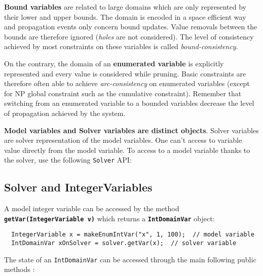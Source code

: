 \begin{note}
\textbf{Bound variables} are related to large domains which are only represented by their lower and upper bounds. The domain is encoded in a space efficient way and propagation events only concern bound updates. Value removals between the bounds are therefore ignored (\emph{holes} are not considered). The level of consistency achieved by most constraints on these variables is called \emph{bound-consistency}.

On the contrary, the domain of an \textbf{enumerated variable} is explicitly represented and every value is considered while pruning. Basic constraints are therefore often able to achieve \emph{arc-consistency} on enumerated variables (except for NP global constraint such as the cumulative constraint). Remember that switching from an enumerated variable to a bounded variables decrease the level of propagation achieved by the system.
\end{note}

\textbf{Model variables and Solver variables are distinct objects}. Solver variables are solver representation of the model variables. One can't access to variable value directly from the model variable. To access to a model variable thanks to the solver, use the following \texttt{Solver} API: 

\subsection{Solver and IntegerVariables}\label{solver:solverandintegervariables}\hypertarget{solver:solverandintegervariables}{}

A model integer variable can be accessed by the method \textbf{\tt getVar(IntegerVariable v)} which returns a \textbf{\tt IntDomainVar} object:
\begin{lstlisting}
  IntegerVariable x = makeEnumIntVar("x", 1, 100);  // model variable
  IntDomainVar xOnSolver = solver.getVar(x);  // solver variable
\end{lstlisting}

The state of an \texttt{IntDomainVar} can be accessed through the main following public methods :

